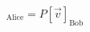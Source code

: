 \documentclass[preview]{standalone}
\begin{document}
\begin{align*}
[\vec{v}]_{\text{Alice}} = P [\vec{v}]_{\text{Bob}}
\end{align*}
\end{document}
